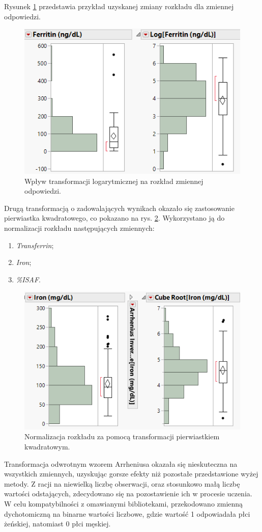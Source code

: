 	Rysunek \ref{fig:log2} przedstawia przykład uzyskanej zmiany rozkładu dla zmiennej odpowiedzi.
	
	\begin{figure}[!ht]
		\centering
		\includegraphics[width=0.6\linewidth]{Rozdzial3/log2}
		\caption{Wpływ transformacji logarytmicznej na rozkład zmiennej odpowiedzi.}
		\label{fig:log2}
	\end{figure}

	Drugą transformacją o zadowalających wynikach okazało się zastosowanie pierwiastka kwadratowego, co pokazano na rys. \ref{fig:cube2}. Wykorzystano ją do normalizacji rozkładu następujących zmiennych:
	
	\begin{enumerate}
		\item \textit{Transferrin};
		\item \textit{Iron};
		\item \textit{\%ISAF}.
	\end{enumerate}

	\begin{figure}
		\centering
		\includegraphics[width=0.6\linewidth]{Rozdzial3/cube2}
		\caption{Normalizacja rozkładu za pomocą transformacji pierwiastkiem kwadratowym.}
		\label{fig:cube2}
	\end{figure}

	Transformacja odwrotnym wzorem Arrheniusa okazała się nieskuteczna na wszystkich zmiennych, uzyskując gorsze efekty niż pozostałe przedstawione wyżej metody. Z racji na niewielką liczbę obserwacji, oraz stosunkowo małą liczbę wartości odstających, zdecydowano się na pozostawienie ich w procesie uczenia. W celu kompatybilności z omawianymi bibliotekami, przekodowano zmienną dychotomiczną na binarne wartości liczbowe, gdzie wartość 1 odpowiadała płci żeńskiej, natomiast 0 płci męskiej.

